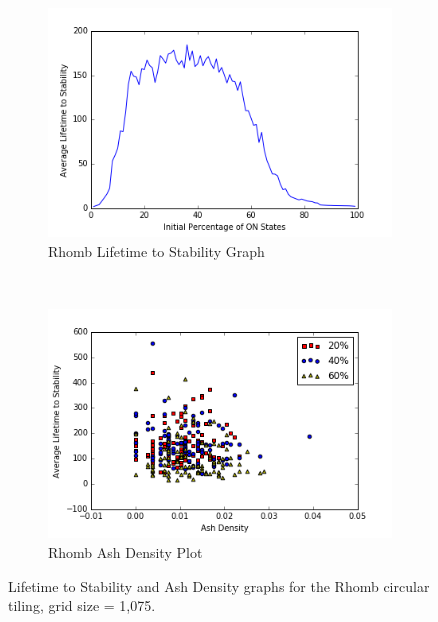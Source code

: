 \documentclass[a4paper,11pt]{report}
\begin{document}
\begin{figure}[htp]
\centering
\begin{subfigure}[t]{0.6\textwidth}
	\centering
	\includegraphics[width=\textwidth]{ch4_figs/crh_lifetime}
	\caption{Rhomb Lifetime to Stability Graph}
\end{subfigure}
~
\begin{subfigure}[t]{0.6\textwidth}
	\centering
	\includegraphics[width=\textwidth]{ch4_figs/crh_ash_density}
	\caption{Rhomb Ash Density Plot}
\end{subfigure}

\caption[Rhomb Lifetime and Ash Density Graphs]{
	Lifetime to Stability and Ash Density graphs for the Rhomb circular tiling, grid size = 1,075. 
}
\label{fig:crh_lifetime_density}
\end{figure}
\end{document}
